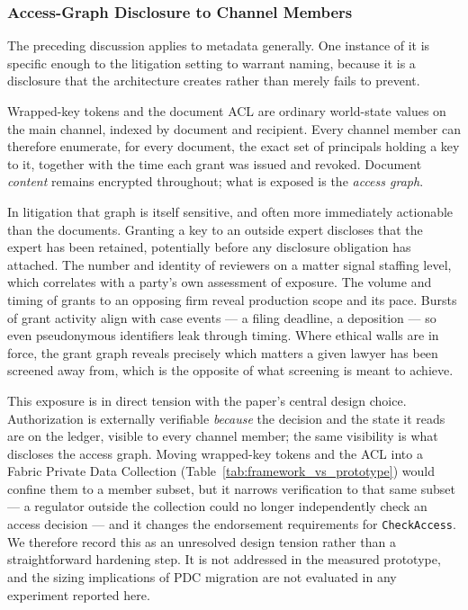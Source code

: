 \documentclass[preprint,12pt]{elsarticle}
\begin{document}
\subsubsection{Access-Graph Disclosure to Channel Members}
\label{sec:accessgraph}
The preceding discussion applies to metadata generally. One instance of it is
specific enough to the litigation setting to warrant naming, because it is a
disclosure that the architecture creates rather than merely fails to prevent.

Wrapped-key tokens and the document ACL are ordinary world-state values on the
main channel, indexed by document and recipient. Every channel member can
therefore enumerate, for every document, the exact set of principals holding a
key to it, together with the time each grant was issued and revoked. Document
\emph{content} remains encrypted throughout; what is exposed is the
\emph{access graph}.

In litigation that graph is itself sensitive, and often more immediately
actionable than the documents. Granting a key to an outside expert discloses
that the expert has been retained, potentially before any disclosure
obligation has attached. The number and identity of reviewers on a matter
signal staffing level, which correlates with a party's own assessment of
exposure. The volume and timing of grants to an opposing firm reveal
production scope and its pace. Bursts of grant activity align with case
events --- a filing deadline, a deposition --- so even pseudonymous
identifiers leak through timing. Where ethical walls are in force, the grant
graph reveals precisely which matters a given lawyer has been screened away
from, which is the opposite of what screening is meant to achieve.

This exposure is in direct tension with the paper's central design choice.
Authorization is externally verifiable \emph{because} the decision and the
state it reads are on the ledger, visible to every channel member; the same
visibility is what discloses the access graph. Moving wrapped-key tokens and
the ACL into a Fabric Private Data Collection (Table~\ref{tab:framework_vs_prototype})
would confine them to a member subset, but it narrows verification to that
same subset --- a regulator outside the collection could no longer
independently check an access decision --- and it changes the endorsement
requirements for \texttt{CheckAccess}. We therefore record this as an
unresolved design tension rather than a straightforward hardening step. It is
not addressed in the measured prototype, and the sizing implications of PDC
migration are not evaluated in any experiment reported here.
\end{document}
